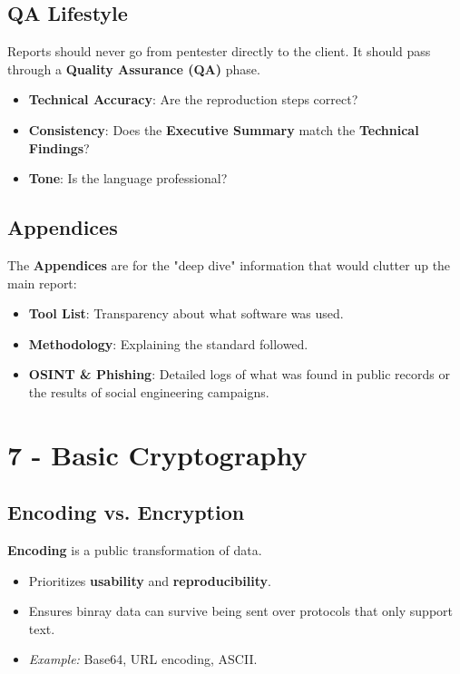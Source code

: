 \documentclass[12pt, letterpaper]{article}
\begin{document}
\subsection*{QA Lifestyle}

Reports should never go from pentester directly to the client. It should pass through a \textbf{Quality Assurance (QA)} phase.

\begin{itemize}
    \item \textbf{Technical Accuracy}: Are the reproduction steps correct?
    \item \textbf{Consistency}: Does the \textbf{Executive Summary} match the \textbf{Technical Findings}?
    \item \textbf{Tone}: Is the language professional?
\end{itemize}

\subsection*{Appendices}

The \textbf{Appendices} are for the "deep dive" information that would clutter up the main report:

\begin{itemize}
    \item \textbf{Tool List}: Transparency about what software was used.
    \item \textbf{Methodology}: Explaining the standard followed.
    \item \textbf{OSINT \& Phishing}: Detailed logs of what was found in public records or the results of social engineering campaigns.
\end{itemize}

\section*{7 - Basic Cryptography}

\subsection*{Encoding vs. Encryption}

\textbf{Encoding} is a public transformation of data.

\begin{itemize}
    \item Prioritizes \textbf{usability} and \textbf{reproducibility}.
    \item Ensures binray data can survive being sent over protocols that only support text.
    \item \textit{Example:} Base64, URL encoding, ASCII.
\end{itemize}
\end{document}
